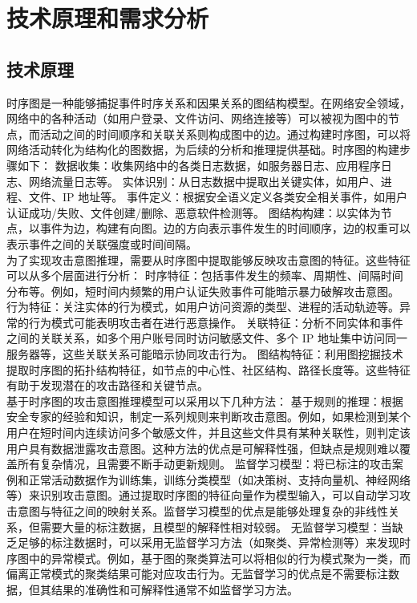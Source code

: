 \documentclass{article} %
\begin{document}
	\section{技术原理和需求分析}
	
	\subsection{技术原理}
	
	时序图是一种能够捕捉事件时序关系和因果关系的图结构模型。在网络安全领域，网络中的各种活动（如用户登录、文件访问、网络连接等）可以被视为图中的节点，而活动之间的时间顺序和关联关系则构成图中的边。通过构建时序图，可以将网络活动转化为结构化的图数据，为后续的分析和推理提供基础。时序图的构建步骤如下：
	数据收集：收集网络中的各类日志数据，如服务器日志、应用程序日志、网络流量日志等。
	实体识别：从日志数据中提取出关键实体，如用户、进程、文件、IP 地址等。
	事件定义：根据安全语义定义各类安全相关事件，如用户认证成功/失败、文件创建/删除、恶意软件检测等。
	图结构构建：以实体为节点，以事件为边，构建有向图。边的方向表示事件发生的时间顺序，边的权重可以表示事件之间的关联强度或时间间隔。\\
	为了实现攻击意图推理，需要从时序图中提取能够反映攻击意图的特征。这些特征可以从多个层面进行分析：
	时序特征：包括事件发生的频率、周期性、间隔时间分布等。例如，短时间内频繁的用户认证失败事件可能暗示暴力破解攻击意图。
	行为特征：关注实体的行为模式，如用户访问资源的类型、进程的活动轨迹等。异常的行为模式可能表明攻击者在进行恶意操作。
	关联特征：分析不同实体和事件之间的关联关系，如多个用户账号同时访问敏感文件、多个 IP 地址集中访问同一服务器等，这些关联关系可能暗示协同攻击行为。
	图结构特征：利用图挖掘技术提取时序图的拓扑结构特征，如节点的中心性、社区结构、路径长度等。这些特征有助于发现潜在的攻击路径和关键节点。\\
	基于时序图的攻击意图推理模型可以采用以下几种方法：
	基于规则的推理：根据安全专家的经验和知识，制定一系列规则来判断攻击意图。例如，如果检测到某个用户在短时间内连续访问多个敏感文件，并且这些文件具有某种关联性，则判定该用户具有数据泄露攻击意图。这种方法的优点是可解释性强，但缺点是规则难以覆盖所有复杂情况，且需要不断手动更新规则。
	监督学习模型：将已标注的攻击案例和正常活动数据作为训练集，训练分类模型（如决策树、支持向量机、神经网络等）来识别攻击意图。通过提取时序图的特征向量作为模型输入，可以自动学习攻击意图与特征之间的映射关系\citep{Chen2023}。监督学习模型的优点是能够处理复杂的非线性关系，但需要大量的标注数据，且模型的解释性相对较弱。
	无监督学习模型：当缺乏足够的标注数据时，可以采用无监督学习方法（如聚类、异常检测等）来发现时序图中的异常模式。例如，基于图的聚类算法可以将相似的行为模式聚为一类，而偏离正常模式的聚类结果可能对应攻击行为。无监督学习的优点是不需要标注数据，但其结果的准确性和可解释性通常不如监督学习方法。
	
\end{document}
